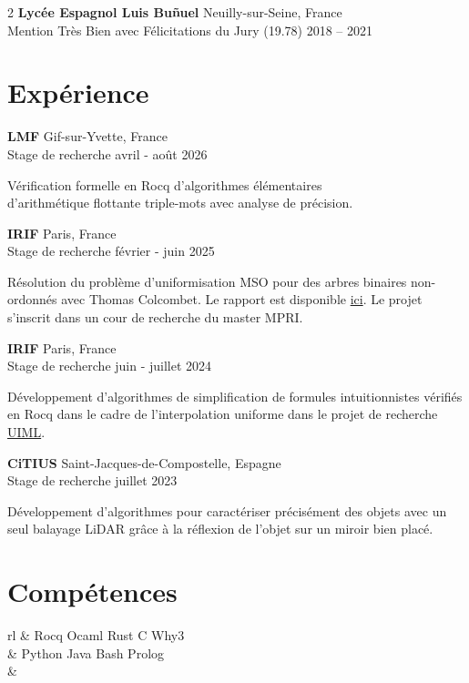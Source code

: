 \documentclass[12pt]{article}
\newcommand{\entry}[4]{{{\textbf{#1}}} \hfill #3 \\ #2 \hfill #4}
\newcommand{\tableentry}[3]{\textsc{#1} & #2\expandafter\ifstrequal\expandafter{#3}{}{\\}{\\[6pt]}}
\begin{document}
\begin{paracol}{2}
	\entry{Lycée Espagnol Luis Buñuel}{Mention Très Bien avec Félicitations du Jury (19.78)}{Neuilly-sur-Seine, France}{2018 -- 2021}

	\section{Expérience}

	\entry{LMF}{Stage de recherche}{Gif-sur-Yvette, France}{avril - août 2026}
	\begin{itemize*}
		\justifying
		\item [] Vérification formelle en Rocq d’algorithmes élémentaires \\ d’arithmétique flottante triple-mots avec analyse de précision.
	\end{itemize*}

	\entry{IRIF}{Stage de recherche}{Paris, France}{février - juin 2025}
	\begin{itemize*}
		\justifying
		\item [] Résolution du problème d'uniformisation MSO pour des arbres binaires non-ordonnés avec Thomas Colcombet. Le rapport
		est disponible \href{https://yag000.github.io/tree-uniformisation/main-uniformisation.pdf}{ici}. Le projet s'inscrit dans un
		cour de recherche du master MPRI.
	\end{itemize*}

	\entry{IRIF}{Stage de recherche}{Paris, France}{juin - juillet 2024}
	\begin{itemize*}
		\justifying
		\item [] Développement d'algorithmes de simplification de formules intuitionnistes vérifiés en Rocq dans le cadre de l'interpolation
		uniforme dans le projet de recherche \href{https://github.com/hferee/UIML}{UIML}\cite{feree:hal-04859429}.
	\end{itemize*}

	\entry{CiTIUS}{Stage de recherche}{Saint-Jacques-de-Compostelle, Espagne}{juillet 2023}
	\begin{itemize*}
		\justifying
		\item [] Développement d'algorithmes pour caractériser précisément des objets avec un seul balayage LiDAR grâce à la réflexion de l'objet sur un miroir bien placé.
	\end{itemize*}

	\switchcolumn

	\section{Compétences}
	\begin{supertabular}{rl}
		\tableentry{\footnotesize\faCode}{Rocq \textperiodcentered{} Ocaml \textperiodcentered{} Rust  \textperiodcentered{} C \textperiodcentered{} Why3}{}
		\tableentry{}{ Python \textperiodcentered{} Java \textperiodcentered{} Bash \textperiodcentered{} Prolog}{}
		\tableentry{}{}{}



\end{supertabular}
\end{paracol}
\end{document}
